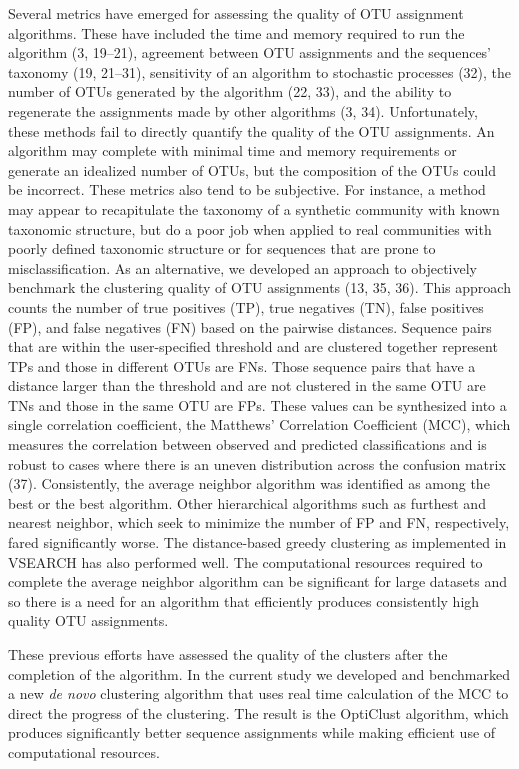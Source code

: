 \documentclass[11pt,]{article}
\begin{document}
Several metrics have emerged for assessing the quality of OTU assignment
algorithms. These have included the time and memory required to run the
algorithm (3, 19--21), agreement between OTU assignments and the
sequences' taxonomy (19, 21--31), sensitivity of an algorithm to
stochastic processes (32), the number of OTUs generated by the algorithm
(22, 33), and the ability to regenerate the assignments made by other
algorithms (3, 34). Unfortunately, these methods fail to directly
quantify the quality of the OTU assignments. An algorithm may complete
with minimal time and memory requirements or generate an idealized
number of OTUs, but the composition of the OTUs could be incorrect.
These metrics also tend to be subjective. For instance, a method may
appear to recapitulate the taxonomy of a synthetic community with known
taxonomic structure, but do a poor job when applied to real communities
with poorly defined taxonomic structure or for sequences that are prone
to misclassification. As an alternative, we developed an approach to
objectively benchmark the clustering quality of OTU assignments (13, 35,
36). This approach counts the number of true positives (TP), true
negatives (TN), false positives (FP), and false negatives (FN) based on
the pairwise distances. Sequence pairs that are within the
user-specified threshold and are clustered together represent TPs and
those in different OTUs are FNs. Those sequence pairs that have a
distance larger than the threshold and are not clustered in the same OTU
are TNs and those in the same OTU are FPs. These values can be
synthesized into a single correlation coefficient, the Matthews'
Correlation Coefficient (MCC), which measures the correlation between
observed and predicted classifications and is robust to cases where
there is an uneven distribution across the confusion matrix (37).
Consistently, the average neighbor algorithm was identified as among the
best or the best algorithm. Other hierarchical algorithms such as
furthest and nearest neighbor, which seek to minimize the number of FP
and FN, respectively, fared significantly worse. The distance-based
greedy clustering as implemented in VSEARCH has also performed well. The
computational resources required to complete the average neighbor
algorithm can be significant for large datasets and so there is a need
for an algorithm that efficiently produces consistently high quality OTU
assignments.

These previous efforts have assessed the quality of the clusters after
the completion of the algorithm. In the current study we developed and
benchmarked a new \emph{de novo} clustering algorithm that uses real
time calculation of the MCC to direct the progress of the clustering.
The result is the OptiClust algorithm, which produces significantly
better sequence assignments while making efficient use of computational
resources.
\end{document}
